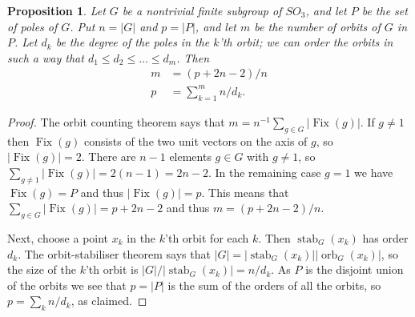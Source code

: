 \documentclass{amsart}
\DeclareMathOperator{\Fix}      {Fix}
\DeclareMathOperator{\orb}      {orb}
\DeclareMathOperator{\stab}     {stab}
\renewcommand{\:}{\colon}
\newtheorem{proposition}[theorem]{Proposition}
\theoremstyle{definition}
\begin{document}
\begin{proposition}
 Let $G$ be a nontrivial finite subgroup of $SO_3$, and let $P$ be the
 set of poles of $G$.  Put $n=|G|$ and $p=|P|$, and let $m$ be the
 number of orbits of $G$ in $P$.  Let $d_k$ be the degree of the poles
 in the $k$'th orbit; we can order the orbits in such a way that
 $d_1\leq d_2\leq\ldots\leq d_m$.  Then
 \begin{align*}
  m &= (p+2n-2)/n \\
  p &= \sum_{k=1}^m n/d_k.
 \end{align*}
\end{proposition}
\begin{proof}
 The orbit counting theorem says that
 $m=n^{-1}\sum_{g\in G}|\Fix(g)|$.  If $g\neq 1$ then $\Fix(g)$
 consists of the two unit vectors on the axis of $g$, so
 $|\Fix(g)|=2$.  There are $n-1$ elements $g\in G$ with $g\neq 1$, so
 $\sum_{g\neq 1}|\Fix(g)|=2(n-1)=2n-2$.  In the remaining case $g=1$
 we have $\Fix(g)=P$ and thus $|\Fix(g)|=p$.  This means that
 $\sum_{g\in G}|\Fix(g)|=p+2n-2$ and thus $m=(p+2n-2)/n$.

 Next, choose a point $x_k$ in the $k$'th orbit for each $k$.  Then
 $\stab_G(x_k)$ has order $d_k$.  The orbit-stabiliser theorem says
 that $|G|=|\stab_G(x_k)||\orb_G(x_k)|$, so the size of the $k$'th
 orbit is $|G|/|\stab_G(x_k)|=n/d_k$.  As $P$ is the disjoint union of
 the orbits we see that $p=|P|$ is the sum of the orders of all the
 orbits, so $p=\sum_k n/d_k$, as claimed.
\end{proof}
\end{document}
